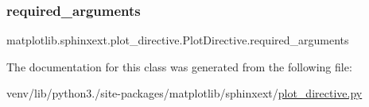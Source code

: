 \subsubsection{\texorpdfstring{required\+\_\+arguments}{required\_arguments}}
{\footnotesize\ttfamily matplotlib.\+sphinxext.\+plot\+\_\+directive.\+Plot\+Directive.\+required\+\_\+arguments\hspace{0.3cm}{\ttfamily [static]}}



The documentation for this class was generated from the following file\+:\begin{DoxyCompactItemize}
\item 
venv/lib/python3./site-\/packages/matplotlib/sphinxext/\hyperlink{plot__directive_8py}{plot\+\_\+directive.\+py}\end{DoxyCompactItemize}
